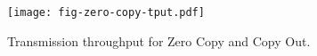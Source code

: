 \begin{figure}[H]
\texttt{[image: fig-zero-copy-tput.pdf]}
\caption{Transmission throughput for Zero Copy and Copy Out.}
\label{fig:zero-copy-tput}
\end{figure}
